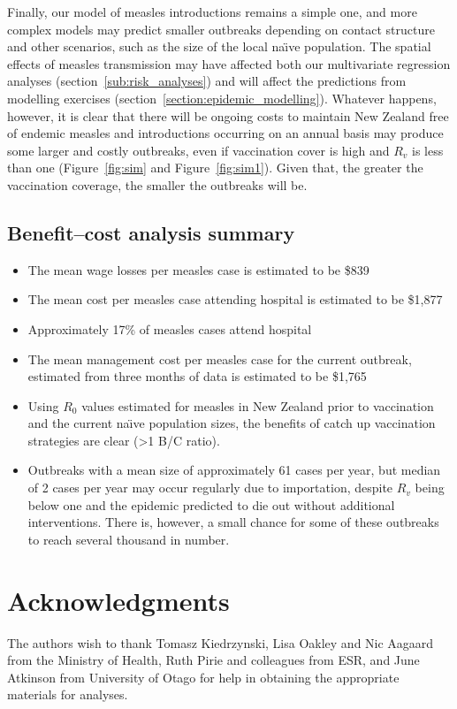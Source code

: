 \documentclass{article}
\begin{document}
Finally, our model of measles introductions remains a simple one, and more complex models may predict smaller outbreaks depending on contact structure and other scenarios, such as the size of the local na\"{\i}ve population. The spatial effects of measles transmission may have affected both our multivariate regression analyses (section~\autoref{sub:risk_analyses}) and will affect the predictions from modelling exercises (section~\autoref{section:epidemic_modelling}). Whatever happens, however, it is clear that there will be ongoing costs to maintain New Zealand free of endemic measles and introductions occurring on an annual basis may produce some larger and costly outbreaks, even if vaccination cover is high and $R_v$ is less than one (Figure~\autoref{fig:sim} and Figure~\autoref{fig:sim1}). Given that, the greater the vaccination coverage, the smaller the outbreaks will be.

\subsection{Benefit--cost analysis summary}
\begin{itemize}
\item The mean wage losses per measles case is estimated to be \$839
\item The mean cost per measles case attending hospital is estimated to be \$1,877
\item Approximately 17\% of measles cases attend hospital
\item The mean management cost per measles case for the current outbreak, estimated from three months of data is estimated to be \$1,765
\item Using $R_0$ values estimated for measles in New Zealand prior to vaccination and the current na\"{\i}ve population sizes, the benefits of catch up vaccination strategies are clear (>1 B/C ratio).
\item Outbreaks with a mean size of approximately 61 cases per year, but median of 2 cases per year may occur regularly due to importation, despite $R_v$ being below one and the epidemic predicted to die out without additional interventions. There is, however, a small chance for some of these outbreaks to reach several thousand in number.
\end{itemize}

\section{Acknowledgments}
The authors wish to thank Tomasz Kiedrzynski, Lisa Oakley and Nic Aagaard from the Ministry of Health, Ruth Pirie and colleagues from ESR, and June Atkinson from University of Otago for help in obtaining the appropriate materials for analyses.
\end{document}
